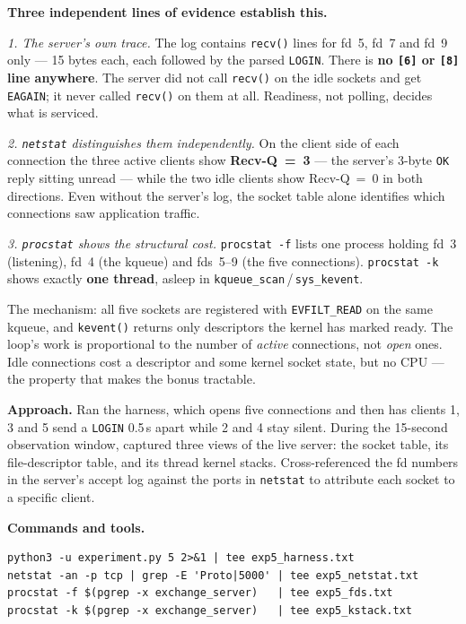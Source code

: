 \documentclass[11pt,a4paper]{article}
\newcommand{\cmd}[1]{\texttt{\small #1}}
\begin{document}
\textbf{Three independent lines of evidence establish this.}

\emph{1. The server's own trace.} The log contains \cmd{recv()} lines for fd~5,
fd~7 and fd~9 only --- 15 bytes each, each followed by the parsed \cmd{LOGIN}.
There is \textbf{no \cmd{[6]} or \cmd{[8]} line anywhere}. The server did not
call \cmd{recv()} on the idle sockets and get \cmd{EAGAIN}; it never called
\cmd{recv()} on them at all. Readiness, not polling, decides what is serviced.

\emph{2. \cmd{netstat} distinguishes them independently.} On the client side of
each connection the three active clients show \textbf{Recv-Q~=~3} --- the
server's 3-byte \cmd{OK} reply sitting unread --- while the two idle clients
show Recv-Q~=~0 in both directions. Even without the server's log, the socket
table alone identifies which connections saw application traffic.

\emph{3. \cmd{procstat} shows the structural cost.} \cmd{procstat -f} lists one
process holding fd~3 (listening), fd~4 (the kqueue) and fds~5--9 (the five
connections). \cmd{procstat -k} shows exactly \textbf{one thread}, asleep in
\cmd{kqueue\_scan}\,/\,\cmd{sys\_kevent}.

The mechanism: all five sockets are registered with \cmd{EVFILT\_READ} on the
same kqueue, and \cmd{kevent()} returns only descriptors the kernel has marked
ready. The loop's work is proportional to the number of \emph{active}
connections, not \emph{open} ones. Idle connections cost a descriptor and some
kernel socket state, but no CPU --- the property that makes the bonus tractable.

\textbf{Approach.} Ran the harness, which opens five connections and then
has clients 1, 3 and 5 send a \cmd{LOGIN} 0.5\,s apart while 2 and 4 stay
silent. During the 15-second observation window, captured three views of the
live server: the socket table, its file-descriptor table, and its thread kernel
stacks. Cross-referenced the fd numbers in the server's accept log against the
ports in \cmd{netstat} to attribute each socket to a specific client.

\textbf{Commands and tools.}
\begin{Verbatim}[fontsize=\small,frame=single]
python3 -u experiment.py 5 2>&1 | tee exp5_harness.txt
netstat -an -p tcp | grep -E 'Proto|5000' | tee exp5_netstat.txt
procstat -f $(pgrep -x exchange_server)   | tee exp5_fds.txt
procstat -k $(pgrep -x exchange_server)   | tee exp5_kstack.txt
\end{Verbatim}
\end{document}
